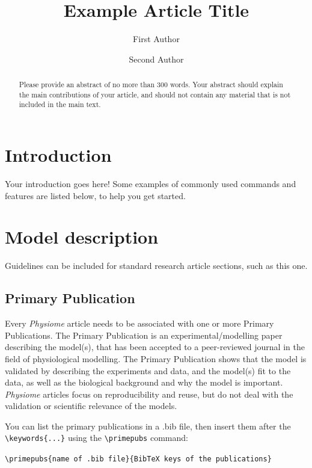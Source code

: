 \documentclass[fleqn,10pt]{physiome}
\title{Example Article Title}
\author[1][corr.author@xyz.ac.mm]{First Author}
\author[2]{Second Author}
\affil[1]{Address of first author}
\affil[2]{Address of second author}
\begin{document}
\maketitle

\begin{abstract}
Please provide an abstract of no more than 300 words. Your abstract should explain the main contributions of your article, and should not contain any material that is not included in the main text.
\end{abstract}



\section{Introduction}

Your introduction goes here! Some examples of commonly used commands and features are listed below, to help you get started.

\section{Model description}

Guidelines can be included for standard research article sections, such as this one.

\subsection{Primary Publication}

Every \emph{Physiome} article needs to be associated with one or more Primary Publications. The Primary Publication is an experimental/modelling paper describing the model(s), that has been accepted to a peer-reviewed journal in the field of physiological modelling. The Primary Publication shows that the model is validated by describing the experiments and data, and the model(s) fit to the data, as well as the biological background and why the model is important.
\emph{Physiome} articles focus on reproducibility and reuse, but do not deal with the validation or scientific relevance of the models.

You can list the primary publications in a .bib file, then insert them after the \verb|\keywords{...}| using the \verb|\primepubs| command:

\verb|\primepubs{name of .bib file}{BibTeX keys of the publications}|
\end{document}
